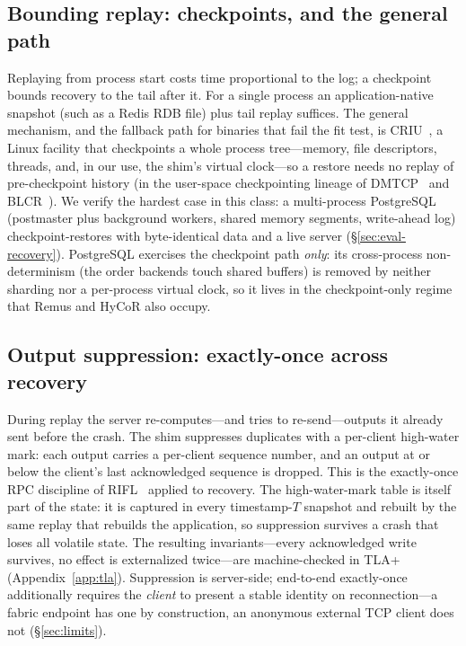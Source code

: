 \subsection{Bounding replay: checkpoints, and the general path}
\label{sec:criu}

Replaying from process start costs time proportional to the log; a
checkpoint bounds recovery to the tail after it. For a single process an
application-native snapshot (such as a Redis RDB file) plus tail replay
suffices. The general mechanism, and the fallback path for binaries that
fail the fit test, is CRIU~\citep{criu}, a Linux facility that checkpoints a
whole process tree---memory, file descriptors, threads, and, in our use,
the shim's virtual clock---so a restore needs no replay of pre-checkpoint
history (in the user-space checkpointing lineage of
DMTCP~\citep{ansel2009dmtcp} and BLCR~\citep{hargrove2006blcr}). We verify
the hardest case in this class: a multi-process PostgreSQL (postmaster plus
background workers, shared memory segments, write-ahead log)
checkpoint-restores with byte-identical data and a live server
(\S\ref{sec:eval-recovery}). PostgreSQL exercises the checkpoint path
\emph{only}: its cross-process non-determinism (the order backends touch
shared buffers) is removed by neither sharding nor a per-process virtual
clock, so it lives in the checkpoint-only regime that Remus and HyCoR
also occupy.

\subsection{Output suppression: exactly-once across recovery}
\label{sec:suppress}

During replay the server re-computes---and tries to re-send---outputs it
already sent before the crash. The shim suppresses duplicates with a
per-client high-water mark: each output carries a per-client sequence
number, and an output at or below the client's last acknowledged sequence
is dropped. This is the exactly-once RPC discipline of
RIFL~\citep{lee2015rifl} applied to recovery. The high-water-mark table is
itself part of the state: it is captured in every timestamp-$T$ snapshot
and rebuilt by the same replay that rebuilds the application, so
suppression survives a crash that loses all volatile state. The resulting
invariants---every acknowledged write survives, no effect is externalized
twice---are machine-checked in TLA+ (Appendix~\ref{app:tla}). Suppression
is server-side; end-to-end exactly-once additionally requires the
\emph{client} to present a stable identity on reconnection---a fabric
endpoint has one by construction, an anonymous external TCP client does
not (\S\ref{sec:limits}).

